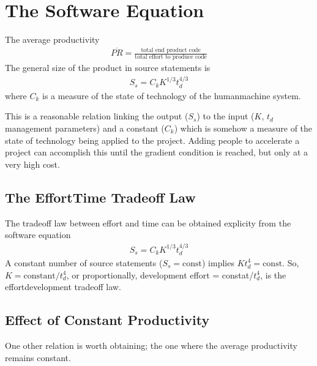 \documentclass[letterpaper,10pt,english]{jupyterBook}
\begin{document}
\section{The Software Equation}
\label{\detokenize{Misc/putnam:the-software-equation}}
\sphinxAtStartPar
The average productivity
\begin{equation*}
\begin{split}
\overline{PR} = \frac{\text{total end product code}}{\text{total effort to produce code}}
\end{split}
\end{equation*}
\sphinxAtStartPar
The general size of the product in source statements is
\begin{equation*}
\begin{split}
S_s = C_k K^{1/3} t_d^{4/3}
\end{split}
\end{equation*}
\sphinxAtStartPar
where \(C_k\) is a measure of the state of technology of the human\sphinxhyphen{}machine system.

\sphinxAtStartPar
This is a reasonable relation linking the output (\(S_s\)) to the input (\(K\), \(t_d\) \sphinxhyphen{} management parameters) and a constant (\(C_k\)) which is somehow a measure of the state of technology being applied to the project.
Adding people to accelerate a project can accomplish this until the gradient condition is reached, but only at a very high cost.


\subsection{The Effort\sphinxhyphen{}Time Tradeoff Law}
\label{\detokenize{Misc/putnam:the-effort-time-tradeoff-law}}
\sphinxAtStartPar
The tradeoff law between effort and time can be obtained
explicity from the software equation
\begin{equation*}
\begin{split}
S_s = C_k K^{1/3} t_d^{4/3}
\end{split}
\end{equation*}
\sphinxAtStartPar
A constant number of source statements (\(S_s = \text{const}\)) implies \(K t_d^4 = \text{const}\).
So, \(K = \text{constant}/t_d^4\), or proportionally, development effort = constat/\(t_d^4\), is the effort\sphinxhyphen{}development tradeoff law.


\subsection{Effect of Constant Productivity}
\label{\detokenize{Misc/putnam:effect-of-constant-productivity}}
\sphinxAtStartPar
One other relation is worth obtaining; the one where the average productivity remains constant.
\end{document}
